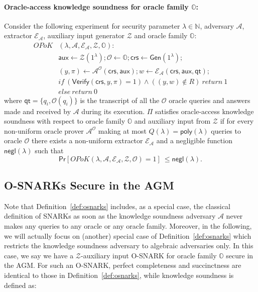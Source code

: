 \begin{definition}
\paragraph{Oracle-access knowledge soundness for oracle family $\mathbb{O}$:} Consider the following experiment for security 
parameter $\lambda \in \mathbb{N}$, adversary $\mathcal{A}$, extractor $\mathcal{E}_{\mathcal{A}}$, auxiliary 
input generator $\mathcal{Z}$ and oracle family $\mathbb{O}$:\\
\begin{align*}
\mathit{OPoK}&(\lambda, \mathcal{A}, \mathcal{E}_{\mathcal{A}}, \mathcal{Z}, \mathbb{O}): \\
& \mathsf{aux} \leftarrow \mathcal{Z}(1^{\lambda}); \mathcal{O} \leftarrow \mathbb{O}; \mathsf{crs} \leftarrow \mathsf{Gen}(1^{\lambda}); \\
& (y,\pi) \leftarrow \mathcal{A}^{\mathcal{O}}(\mathsf{crs},\mathsf{aux}); w \leftarrow \mathcal{E}_{\mathcal{A}}(\mathsf{crs}, \mathsf{aux}, \mathsf{qt}); \\
& \mathit{if} \ (\mathsf{Verify}(\mathsf{crs}, y, \pi) = 1) \wedge ((y,w) \notin R) \ \mathit{return}  \ 1 \\
& \mathit{else} \ \mathit{return} \ 0
\end{align*}
\noindent where $\mathsf{qt} = \{q_i, \mathcal{O}(q_i)\}$ is the transcript of all the $\mathcal{O}$ oracle queries and answers made and received by 
$\mathcal{A}$ during its execution. $\Pi$ satisfies oracle-access knowledge soundness with respect to oracle family  $\mathbb{O}$ and auxiliary 
input from $\mathcal{Z}$ if for every non-uniform oracle prover $\mathcal{A}^{\mathcal{O}}$  
making at most $Q(\lambda) = \mathsf{poly}(\lambda)$ queries to oracle $\mathcal{O}$ there exists a non-uniform extractor 
$\mathcal{E}_{\mathcal{A}}$ and a negligible function $\mathsf{negl}(\lambda)$ such that 
$$\mathsf{Pr}[\mathit{OPoK}(\lambda, \mathcal{A}, \mathcal{E}_{\mathcal{A}}, \mathcal{Z}, \mathcal{O}) =  1]\ \leq \mathsf{negl}(\lambda).$$ 
\end{definition} 

\subsection{O-SNARKs Secure in the AGM}
\noindent Note that Definition~\ref{def:osnarks} includes, as a special case, the classical definition of SNARKs as soon as the knowledge soundness 
adversary $\mathcal{A}$ never makes any queries to any oracle or any oracle family. Moreover, in the following, we will actually focus on 
(another) special case of Definition~\ref{def:osnarks} which restricts the knowledge soundness adversary to algebraic adversaries only. 
In this case, we say we have a $\mathcal{Z}$-auxiliary input O-SNARK for oracle family $\mathbb{O}$ secure in the AGM. For such an O-SNARK,  
perfect completeness and succinctness are identical to those in Definition~\ref{def:osnarks}, while knowledge soundness is defined as: 
 
